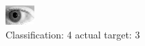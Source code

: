 \begin{figure}[h!]
\begin{center}
\includegraphics[width=0.60\columnwidth]{figures/ID315_class_4_target_3.png}
\end{center}
\caption{ Classification: 4 actual target: 3}
\label{fig:ID315_class_4_target_3}
\end{figure}
